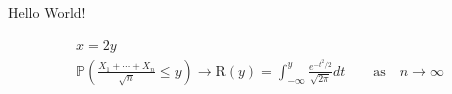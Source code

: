 \documentclass{ist-thesis}
\begin{document}
Hello World!

\begin{gather*}
	x = 2y \\
	\mathbb{P}\left(\frac{X_1 + \cdots + X_n}{\sqrt{n}} \leq y\right) \rightarrow \mathrm{R}(y) = \int_{-\infty}^{y} \frac{e^{-t^2/2}}{\sqrt{2\pi}}dt \qquad \mathrm{as} \quad n \rightarrow \infty
\end{gather*}
\end{document}
